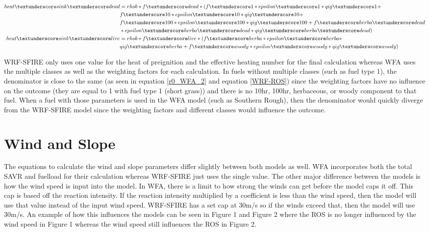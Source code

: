 \documentclass{article}
\newcommand\und{\textunderscore}
\begin{document}
\begin{equation}
	\label{heat_sink}
	\begin{split}
	heat\und sink\und dead &= rhob * f\und dead * ( f\und 1 * epsilon\und 1 * qig\und 1 + \\
	&f\und 10 * epsilon\und 10 * qig\und 10 + \\
	&f\und 100 * epsilon\und 100 * qig\und 100 + f\und herba\und dead \\
	&* epsilon\und herba\und dead * qig\und herba\und dead) \\
	heat\und sink\und live   &= rhob * f\und live * (f\und herba * epsilon\und herba * \\
    &qig\und herba +
    f\und woody * epsilon\und woody * qig\und woody)
	\end{split}
\end{equation}

 WRF-SFIRE only uses one value for the heat of preignition and the effective heating number for the final calculation whereas WFA uses the multiple classes as well as the weighting factors for each calculation. In fuels without multiple classes (such as fuel type 1), the denominator is close to the same (as seen in equation \ref{r0_WFA_2} and equation \ref{WRF-ROS}) since the weighting factors have no influence on the outcome (they are equal to 1 with fuel type 1 (short grass)) and there is no 10hr, 100hr, herbaceous, or woody component to that fuel. When a fuel with those parameters is used in the WFA model (such as Southern Rough), then the denominator would quickly diverge from the WRF-SFIRE model since the weighting factors and different classes would influence the outcome. 
 
 
 \section{Wind and Slope}
 
 The equations to calculate the wind and slope parameters differ slightly between both models as well. WFA incorporates both the total SAVR and fuelload for their calculation whereas WRF-SFIRE just uses the single value. The other major difference between the models is how the wind speed is input into the model. In WFA, there is a limit to how strong the winds can get before the model caps it off. This cap is based off the reaction intensity. If the reaction intensity multiplied by a coefficient is less than the wind speed, then the model will use that value instead of the input wind speed. WRF-SFIRE has a set cap at 30m/s so if the winds exceed that, then the model will use 30m/s. An example of how this influences the models can be seen in Figure 1 and Figure 2 where the ROS is no longer influenced by the wind speed in Figure 1 whereas the wind speed still influences the ROS in Figure 2. 
\end{document}
